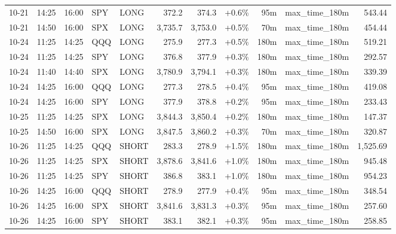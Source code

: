 \documentclass[11pt,a4paper,twoside]{article}
\begin{document}
\begin{center}
\begin{longtable}{>{\color{txtmain}}l l l l l r r r r >{\color{txtmain}}l r}
10-21 & 14:25 & 16:00 & SPY & LONG & 372.2 & 374.3 & \textcolor{wingreen}{+0.6\%} & 95m & max\_time\_180m & \textcolor{wingreen}{543.44} \\
10-21 & 14:50 & 16:00 & SPX & LONG & 3,735.7 & 3,753.0 & \textcolor{wingreen}{+0.5\%} & 70m & max\_time\_180m & \textcolor{wingreen}{454.44} \\
10-24 & 11:25 & 14:25 & QQQ & LONG & 275.9 & 277.3 & \textcolor{wingreen}{+0.5\%} & 180m & max\_time\_180m & \textcolor{wingreen}{519.21} \\
10-24 & 11:25 & 14:25 & SPY & LONG & 376.8 & 377.9 & \textcolor{wingreen}{+0.3\%} & 180m & max\_time\_180m & \textcolor{wingreen}{292.57} \\
10-24 & 11:40 & 14:40 & SPX & LONG & 3,780.9 & 3,794.1 & \textcolor{wingreen}{+0.3\%} & 180m & max\_time\_180m & \textcolor{wingreen}{339.39} \\
10-24 & 14:25 & 16:00 & QQQ & LONG & 277.3 & 278.5 & \textcolor{wingreen}{+0.4\%} & 95m & max\_time\_180m & \textcolor{wingreen}{419.08} \\
10-24 & 14:25 & 16:00 & SPY & LONG & 377.9 & 378.8 & \textcolor{wingreen}{+0.2\%} & 95m & max\_time\_180m & \textcolor{wingreen}{233.43} \\
10-25 & 11:25 & 14:25 & SPX & LONG & 3,844.3 & 3,850.4 & \textcolor{wingreen}{+0.2\%} & 180m & max\_time\_180m & \textcolor{wingreen}{147.37} \\
10-25 & 14:50 & 16:00 & SPX & LONG & 3,847.5 & 3,860.2 & \textcolor{wingreen}{+0.3\%} & 70m & max\_time\_180m & \textcolor{wingreen}{320.87} \\
10-26 & 11:25 & 14:25 & QQQ & SHORT & 283.3 & 278.9 & \textcolor{wingreen}{+1.5\%} & 180m & max\_time\_180m & \textcolor{wingreen}{1,525.69} \\
10-26 & 11:25 & 14:25 & SPX & SHORT & 3,878.6 & 3,841.6 & \textcolor{wingreen}{+1.0\%} & 180m & max\_time\_180m & \textcolor{wingreen}{945.48} \\
10-26 & 11:25 & 14:25 & SPY & SHORT & 386.8 & 383.1 & \textcolor{wingreen}{+1.0\%} & 180m & max\_time\_180m & \textcolor{wingreen}{954.23} \\
10-26 & 14:25 & 16:00 & QQQ & SHORT & 278.9 & 277.9 & \textcolor{wingreen}{+0.4\%} & 95m & max\_time\_180m & \textcolor{wingreen}{348.54} \\
10-26 & 14:25 & 16:00 & SPX & SHORT & 3,841.6 & 3,831.3 & \textcolor{wingreen}{+0.3\%} & 95m & max\_time\_180m & \textcolor{wingreen}{257.60} \\
10-26 & 14:25 & 16:00 & SPY & SHORT & 383.1 & 382.1 & \textcolor{wingreen}{+0.3\%} & 95m & max\_time\_180m & \textcolor{wingreen}{258.85} \\

\end{longtable}
\end{center}
\end{document}
